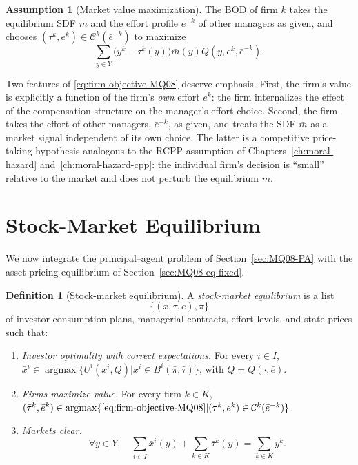 \documentclass[11pt,a4paper,oneside]{book}
\DeclareMathOperator*{\argmax}{argmax}
\theoremstyle{plain}
\theoremstyle{definition}
\newtheorem{definition}[theorem]{Definition}
\newtheorem{assumption}[theorem]{Assumption}
\theoremstyle{remark}
\numberwithin{equation}{chapter}
\begin{document}
\begin{assumption}[Market value maximization]\label{ass:MV-max}
The BOD of firm $k$ takes the equilibrium SDF $\bar{m}$ and the effort profile $\bar{e}^{-k}$ of other managers as given, and chooses $(\tau^k, e^k) \in \mathcal{C}^k(\bar{e}^{-k})$ to maximize
\begin{equation}\label{eq:firm-objective-MQ08}
  \sum_{y \in Y} \bigl( y^k - \tau^k(y) \bigr) \bar{m}(y) Q(y, e^k, \bar{e}^{-k}).
\end{equation}
\end{assumption}

Two features of \eqref{eq:firm-objective-MQ08} deserve emphasis.
First, the firm's value is explicitly a function of the firm's \emph{own} effort $e^k$: the firm internalizes the effect of the compensation structure on the manager's effort choice.
Second, the firm takes the effort of other managers, $\bar{e}^{-k}$, as given, and treats the SDF $\bar{m}$ as a market signal independent of its own choice.
The latter is a competitive price-taking hypothesis analogous to the RCPP assumption of Chapters~\ref{ch:moral-hazard} and~\ref{ch:moral-hazard-cpp}: the individual firm's decision is ``small'' relative to the market and does not perturb the equilibrium $\bar{m}$.

\section{Stock-Market Equilibrium}
\label{sec:MQ08-full-eq}

We now integrate the principal--agent problem of Section~\ref{sec:MQ08-PA} with the asset-pricing equilibrium of Section~\ref{sec:MQ08-eq-fixed}.

\begin{definition}[Stock-market equilibrium]\label{def:MQ08-full-eq}
A \emph{stock-market equilibrium} is a list
\begin{equation*}
  \bigl\{ (\bar{x}, \bar{\tau}, \bar{e}), \bar{\pi} \bigr\}
\end{equation*}
of investor consumption plans, managerial contracts, effort levels, and state prices such that:
\begin{enumerate}
  \item[(a)] \emph{Investor optimality with correct expectations.}
  For every $i \in I$, $\bar{x}^i \in \argmax \{ U^i(x^i, \bar{Q}) \vert x^i \in B^i(\bar{\pi}, \bar{\tau}) \}$, with $\bar{Q} = Q(\cdot, \bar{e})$.
  \item[(b)] \emph{Firms maximize value.}
  For every firm $k \in K$, $(\bar{\tau}^k, \bar{e}^k) \in \argmax \{ \eqref{eq:firm-objective-MQ08} \vert (\tau^k, e^k) \in \mathcal{C}^k(\bar{e}^{-k}) \}$.
  \item[(c)] \emph{Markets clear.}
  \begin{equation*}
    \forall y \in Y, \quad \sum_{i \in I} \bar{x}^i(y) + \sum_{k \in K} \bar{\tau}^k(y) = \sum_{k \in K} y^k.
  \end{equation*}
\end{enumerate}
\end{definition}
\end{document}
